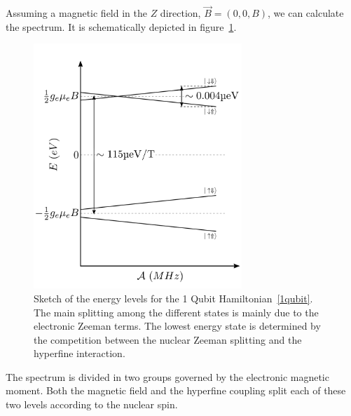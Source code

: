 Assuming a magnetic field in the $Z$ direction, $\vec{B}=(0,0,B)$, we can calculate the spectrum. It is schematically depicted in figure~\ref{levels1Qbit}.
\begin{figure}[h!]
\centering
\includegraphics[width=0.7\textwidth]{defects/fig/qbit_states.pdf} %
\vspace{-20pt}
\caption{Sketch of the energy levels for the 1 Qubit Hamiltonian~\eqref{1qubit}. The main splitting among the different states is mainly due to the electronic Zeeman terms. The lowest energy state is determined by the competition between the nuclear Zeeman splitting and the hyperfine interaction.}
\label{levels1Qbit}
\end{figure}
The spectrum is divided in two groups governed by the electronic magnetic moment. Both the magnetic field and the hyperfine coupling split each of these two levels according to the nuclear spin.

